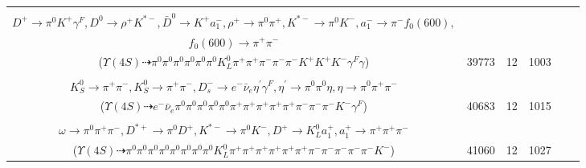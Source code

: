 \documentclass[landscape]{article}
\newcounter{rownumbers}
\newcommand\rn{\stepcounter{rownumbers}\arabic{rownumbers}}
\newcommand{\EOLP}{\\ \hline} %
\newcommand{\topoTags}[1]{#1} %
\begin{document}
\begin{longtable}{clcccc}
\rn & \makecell[l]{ $ 
\Upsilon(4S) \rightarrow B^{0} \bar{B}^{0} ,
B^{0} \rightarrow \pi^{0} \pi^{0} K^{0} D^{*0} \bar{D}^{*0} ,
\bar{B}^{0} \rightarrow \pi^{-} D^{+} ,
K^{0} \rightarrow K_{L}^{0} ,
D^{*0} \rightarrow D^{0} \gamma ,
\bar{D}^{*0} \rightarrow \pi^{0} \bar{D}^{0} ,
$ \\ $
D^{+} \rightarrow \pi^{0} K^{+} \gamma^{F} ,
D^{0} \rightarrow \rho^{+} K^{*-} ,
\bar{D}^{0} \rightarrow K^{+} a_{1}^{-} ,
\rho^{+} \rightarrow \pi^{0} \pi^{+} ,
K^{*-} \rightarrow \pi^{0} K^{-} ,
a_{1}^{-} \rightarrow \pi^{-} f_{0}(600) ,
$ \\ $
f_{0}(600) \rightarrow \pi^{+} \pi^{-} 
$ \\ ($
\Upsilon(4S) \dashrightarrow \pi^{0} \pi^{0} \pi^{0} \pi^{0} \pi^{0} \pi^{0} K_{L}^{0} \pi^{+} \pi^{+} \pi^{-} \pi^{-} \pi^{-} K^{+} K^{+} K^{-} \gamma^{F} \gamma 
$) } & \topoTags{39773 & }12 & 1003 \EOLP

\rn & \makecell[l]{ $ 
\Upsilon(4S) \rightarrow B^{0} \bar{B}^{0} ,
B^{0} \rightarrow \pi^{+} D^{-} ,
\bar{B}^{0} \rightarrow D^{+} D_{s0}^{*-} ,
D^{-} \rightarrow K_{S}^{0} K^{-} ,
D^{+} \rightarrow \pi^{0} \pi^{+} K_{S}^{0} ,
D_{s0}^{*-} \rightarrow \pi^{0} D_{s}^{-} ,
$ \\ $
K_{S}^{0} \rightarrow \pi^{+} \pi^{-} ,
K_{S}^{0} \rightarrow \pi^{+} \pi^{-} ,
D_{s}^{-} \rightarrow e^{-} \bar{\nu}_{e} \eta^{\prime} \gamma^{F} ,
\eta^{\prime} \rightarrow \pi^{0} \pi^{0} \eta ,
\eta \rightarrow \pi^{0} \pi^{+} \pi^{-} 
$ \\ ($
\Upsilon(4S) \dashrightarrow e^{-} \bar{\nu}_{e} \pi^{0} \pi^{0} \pi^{0} \pi^{0} \pi^{0} \pi^{+} \pi^{+} \pi^{+} \pi^{+} \pi^{+} \pi^{-} \pi^{-} \pi^{-} K^{-} \gamma^{F} 
$) } & \topoTags{40683 & }12 & 1015 \EOLP

\rn & \makecell[l]{ $ 
\Upsilon(4S) \rightarrow \bar{B}^{0} \bar{B}^{0} ,
\bar{B}^{0} \rightarrow \pi^{+} \bar{K}_1^{\prime-} ,
\bar{B}^{0} \rightarrow \pi^{0} \pi^{0} \pi^{-} \pi^{-} \rho^{+} \omega \omega D^{*+} ,
\bar{K}_1^{\prime-} \rightarrow \pi^{0} K^{*-} ,
\rho^{+} \rightarrow \pi^{0} \pi^{+} ,
\omega \rightarrow \pi^{0} \pi^{+} \pi^{-} ,
$ \\ $
\omega \rightarrow \pi^{0} \pi^{+} \pi^{-} ,
D^{*+} \rightarrow \pi^{0} D^{+} ,
K^{*-} \rightarrow \pi^{0} K^{-} ,
D^{+} \rightarrow K_{L}^{0} a_{1}^{+} ,
a_{1}^{+} \rightarrow \pi^{+} \pi^{+} \pi^{-} 
$ \\ ($
\Upsilon(4S) \dashrightarrow \pi^{0} \pi^{0} \pi^{0} \pi^{0} \pi^{0} \pi^{0} \pi^{0} \pi^{0} K_{L}^{0} \pi^{+} \pi^{+} \pi^{+} \pi^{+} \pi^{+} \pi^{+} \pi^{-} \pi^{-} \pi^{-} \pi^{-} \pi^{-} K^{-} 
$) } & \topoTags{41060 & }12 & 1027 \EOLP


\end{longtable}
\end{document}
